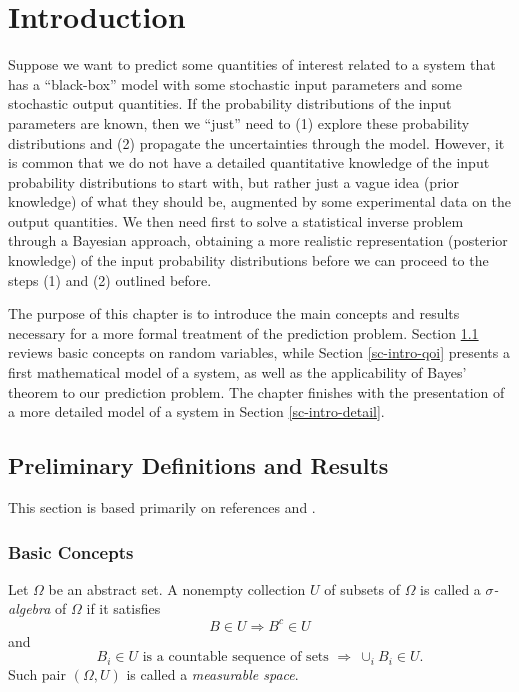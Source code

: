 \chapter{Introduction}\label{ch-int}
\thispagestyle{headings}

Suppose we want to predict some quantities of interest related to a system that
has a ``black-box'' model with
some stochastic input parameters and
some stochastic output quantities.
If the probability distributions of the input parameters are known, then we ``just'' need to
(1) explore these probability distributions and (2) propagate the uncertainties through the model.
However, it is common that we do not have a detailed quantitative knowledge of the input probability distributions to start with,
but rather just a vague idea (prior knowledge) of what they should be, augmented by some experimental data on the output quantities.
We then need first to solve a statistical inverse problem through a Bayesian approach, obtaining a more realistic representation
(posterior knowledge) of the input probability distributions before we can proceed to the steps (1) and (2) outlined before.

The purpose of this chapter is to introduce the main concepts and results necessary for
a more formal treatment of the prediction problem.
Section \ref{sc-intro-prelim} reviews basic concepts on random variables, while
Section \ref{sc-intro-qoi} presents a first mathematical model of a system, as well as the applicability of Bayes' theorem to our prediction problem.
The chapter finishes with the presentation of a more detailed model of a system in Section \ref{sc-intro-detail}.

\section{Preliminary Definitions and Results}\label{sc-intro-prelim}

This section is based primarily on references \cite{Du05} and \cite{JaPr04}.

\subsection{Basic Concepts}\label{subsc-intro-prelim-basic}

Let $\Omega$ be an abstract set. A nonempty collection $U$ of subsets of $\Omega$ is called a {\it $\sigma$-algebra} of $\Omega$ if it satisfies
\begin{equation*}
B\in U \Rightarrow B^c\in U
\end{equation*}
and
\begin{equation*}
B_i\in U\mbox{ is a countable sequence of sets }\Rightarrow~\cup_iB_i\in U.
\end{equation*}
Such pair $(\Omega,U)$ is called a {\it measurable space}.

